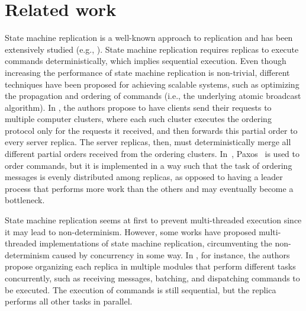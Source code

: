 \documentclass[11pt]{article}
\begin{document}
\label{sec:evaluation:result}


\section{Related work}
\label{sec:rwork}

State machine replication is a well-known approach to replication and has been extensively studied (e.g., \cite{Lam78, Sch90, kapritsos2012eve, kotla2004htbft, santos2013htsmr}).
State machine replication requires replicas to execute commands deterministically, which implies sequential execution.
Even though increasing the performance of state machine replication is non-trivial, different techniques have been proposed for achieving scalable systems, such as optimizing the propagation and ordering of commands (i.e., the underlying atomic broadcast algorithm).
In \cite{kapritsos2010scalable}, the authors propose to have clients send their requests to multiple computer clusters, where each such cluster executes the ordering protocol only for the requests it received, and then forwards this partial order to every server replica.
The server replicas, then, must deterministically merge all different partial orders received from the ordering clusters.
In~\cite{biely2012spaxos}, Paxos~\cite{Lam98} is used to order commands, but it is implemented in a way such that the task of ordering messages is evenly distributed among replicas, as opposed to having a leader process that performs more work than the others and may eventually become a bottleneck.

State machine replication seems at first to prevent multi-threaded execution since it may lead to non-determinism.
However, some works have proposed multi-threaded implementations of state machine replication, circumventing the non-determinism caused by concurrency in some way.
In \cite{santos2013htsmr}, for instance, the authors propose organizing each replica in multiple modules that perform different tasks concurrently, such as receiving messages, batching, and dispatching commands to be executed.
The execution of commands is still sequential, but the replica performs all other tasks in parallel. 
\end{document}
